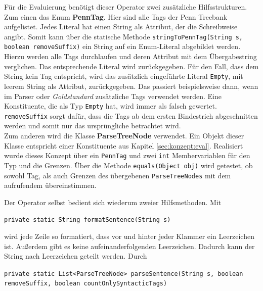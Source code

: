 Für die Evaluierung benötigt dieser Operator zwei zusätzliche Hilfsstrukturen. Zum einen das Enum \textbf{PennTag}. Hier sind alle Tags der Penn Treebank aufgelistet. Jedes Literal hat einen String als Attribut, der die Schreibweise angibt. Somit kann über die statische Methode \texttt{stringToPennTag(String s, boolean removeSuffix)} ein String auf ein Enum-Literal abgebildet werden. Hierzu werden alle Tags durchlaufen und deren Attribut mit dem Übergabestring verglichen. Das entsprechende Literal wird zurückgegeben. Für den Fall, dass dem String kein Tag entspricht, wird das zusätzlich eingeführte Literal \texttt{Empty}, mit leerem String als Attribut, zurückgegeben. Das passiert beispielsweise dann, wenn im Parser oder \textit{Goldstandard} zusätzliche Tags verwendet werden. Eine Konstituente, die als Typ \texttt{Empty} hat, wird immer als falsch gewertet. \texttt{removeSuffix} sorgt dafür, dass die Tags ab dem ersten Bindestrich abgeschnitten werden und somit nur das ursprüngliche betrachtet wird. \\
Zum anderen wird die Klasse \textbf{ParseTreeNode} verwendet. Ein Objekt dieser Klasse entspricht einer Konstituente aus Kapitel \ref{sec:konzept:eval}. Realisiert wurde dieses Konzept über ein \texttt{PennTag} und zwei \texttt{int} Membervariablen für den Typ und die Grenzen. Über die Methode \texttt{equals(Object obj)} wird getestet, ob sowohl Tag, als auch Grenzen des übergebenen \texttt{ParseTreeNodes} mit dem aufrufendem übereinstimmen. 

Der Operator selbst bedient sich wiederum zweier Hilfsmethoden. Mit 

\texttt{private static String formatSentence(String s)} 

wird jede Zeile so formatiert, dass vor und hinter jeder Klammer ein Leerzeichen ist. Außerdem gibt es keine aufeinanderfolgenden Leerzeichen. Dadurch kann der String nach Leerzeichen geteilt werden. Durch

\texttt{private static List<ParseTreeNode> parseSentence(String s, boolean removeSuffix, boolean countOnlySyntacticTags)}

